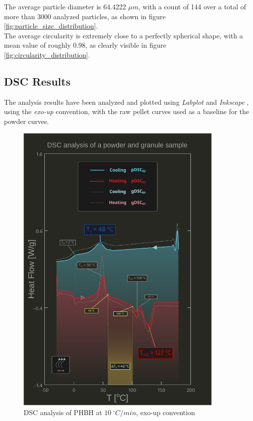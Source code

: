 \documentclass{article}
\begin{document}
      The average particle diameter is 64.4222 $\mu m$, with a count of 144 over a total of more 
      than 3000 analyzed particles, as shown in figure \ref{fig:particle_size_distribution}. \\ 
  
      The average circularity is extremely close to a perfectly spherical shape, with a 
      mean value of roughly 0.98, as clearly visible in figure \ref{fig:circularity_distribution}. \\ 

      \clearpage

    \subsection{DSC Results\label{DSC_results}}

    The analysis results have been analyzed and plotted using \textit{Labplot} \autocites{Labplot} 
    and \textit{Inkscape} \autocites{Inkscape},
    using the \textit{exo-up} convention, with the raw pellet curves used as a baseline for the powder curves. \\
        \begin{figure}[h!]
            \includegraphics[width=0.9\textwidth]{Pictures/Thermal_analysis_plots/DSC_alberto.pdf}
            \caption{DSC analysis of PHBH at $10 \ ^{\circ}C/min$, exo-up convention}
            \label{fig:DSC_10Cmin}
        \end{figure}
\end{document}

